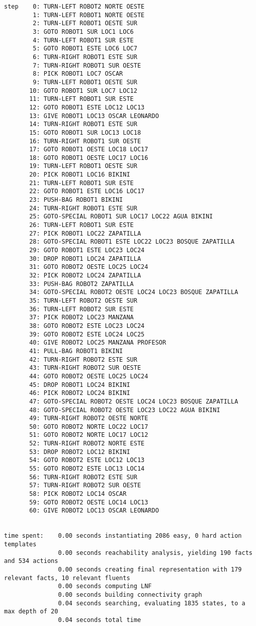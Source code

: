 \documentclass{article}
\begin{document}
\begin{lstlisting}
step    0: TURN-LEFT ROBOT2 NORTE OESTE
        1: TURN-LEFT ROBOT1 NORTE OESTE
        2: TURN-LEFT ROBOT1 OESTE SUR
        3: GOTO ROBOT1 SUR LOC1 LOC6
        4: TURN-LEFT ROBOT1 SUR ESTE
        5: GOTO ROBOT1 ESTE LOC6 LOC7
        6: TURN-RIGHT ROBOT1 ESTE SUR
        7: TURN-RIGHT ROBOT1 SUR OESTE
        8: PICK ROBOT1 LOC7 OSCAR
        9: TURN-LEFT ROBOT1 OESTE SUR
       10: GOTO ROBOT1 SUR LOC7 LOC12
       11: TURN-LEFT ROBOT1 SUR ESTE
       12: GOTO ROBOT1 ESTE LOC12 LOC13
       13: GIVE ROBOT1 LOC13 OSCAR LEONARDO
       14: TURN-RIGHT ROBOT1 ESTE SUR
       15: GOTO ROBOT1 SUR LOC13 LOC18
       16: TURN-RIGHT ROBOT1 SUR OESTE
       17: GOTO ROBOT1 OESTE LOC18 LOC17
       18: GOTO ROBOT1 OESTE LOC17 LOC16
       19: TURN-LEFT ROBOT1 OESTE SUR
       20: PICK ROBOT1 LOC16 BIKINI
       21: TURN-LEFT ROBOT1 SUR ESTE
       22: GOTO ROBOT1 ESTE LOC16 LOC17
       23: PUSH-BAG ROBOT1 BIKINI
       24: TURN-RIGHT ROBOT1 ESTE SUR
       25: GOTO-SPECIAL ROBOT1 SUR LOC17 LOC22 AGUA BIKINI
       26: TURN-LEFT ROBOT1 SUR ESTE
       27: PICK ROBOT1 LOC22 ZAPATILLA
       28: GOTO-SPECIAL ROBOT1 ESTE LOC22 LOC23 BOSQUE ZAPATILLA
       29: GOTO ROBOT1 ESTE LOC23 LOC24
       30: DROP ROBOT1 LOC24 ZAPATILLA
       31: GOTO ROBOT2 OESTE LOC25 LOC24
       32: PICK ROBOT2 LOC24 ZAPATILLA
       33: PUSH-BAG ROBOT2 ZAPATILLA
       34: GOTO-SPECIAL ROBOT2 OESTE LOC24 LOC23 BOSQUE ZAPATILLA
       35: TURN-LEFT ROBOT2 OESTE SUR
       36: TURN-LEFT ROBOT2 SUR ESTE
       37: PICK ROBOT2 LOC23 MANZANA
       38: GOTO ROBOT2 ESTE LOC23 LOC24
       39: GOTO ROBOT2 ESTE LOC24 LOC25
       40: GIVE ROBOT2 LOC25 MANZANA PROFESOR
       41: PULL-BAG ROBOT1 BIKINI
       42: TURN-RIGHT ROBOT2 ESTE SUR
       43: TURN-RIGHT ROBOT2 SUR OESTE
       44: GOTO ROBOT2 OESTE LOC25 LOC24
       45: DROP ROBOT1 LOC24 BIKINI
       46: PICK ROBOT2 LOC24 BIKINI
       47: GOTO-SPECIAL ROBOT2 OESTE LOC24 LOC23 BOSQUE ZAPATILLA
       48: GOTO-SPECIAL ROBOT2 OESTE LOC23 LOC22 AGUA BIKINI
       49: TURN-RIGHT ROBOT2 OESTE NORTE
       50: GOTO ROBOT2 NORTE LOC22 LOC17
       51: GOTO ROBOT2 NORTE LOC17 LOC12
       52: TURN-RIGHT ROBOT2 NORTE ESTE
       53: DROP ROBOT2 LOC12 BIKINI
       54: GOTO ROBOT2 ESTE LOC12 LOC13
       55: GOTO ROBOT2 ESTE LOC13 LOC14
       56: TURN-RIGHT ROBOT2 ESTE SUR
       57: TURN-RIGHT ROBOT2 SUR OESTE
       58: PICK ROBOT2 LOC14 OSCAR
       59: GOTO ROBOT2 OESTE LOC14 LOC13
       60: GIVE ROBOT2 LOC13 OSCAR LEONARDO


time spent:    0.00 seconds instantiating 2086 easy, 0 hard action templates
               0.00 seconds reachability analysis, yielding 190 facts and 534 actions
               0.00 seconds creating final representation with 179 relevant facts, 10 relevant fluents
               0.00 seconds computing LNF
               0.00 seconds building connectivity graph
               0.04 seconds searching, evaluating 1835 states, to a max depth of 20
               0.04 seconds total time
\end{lstlisting}
\end{document}
